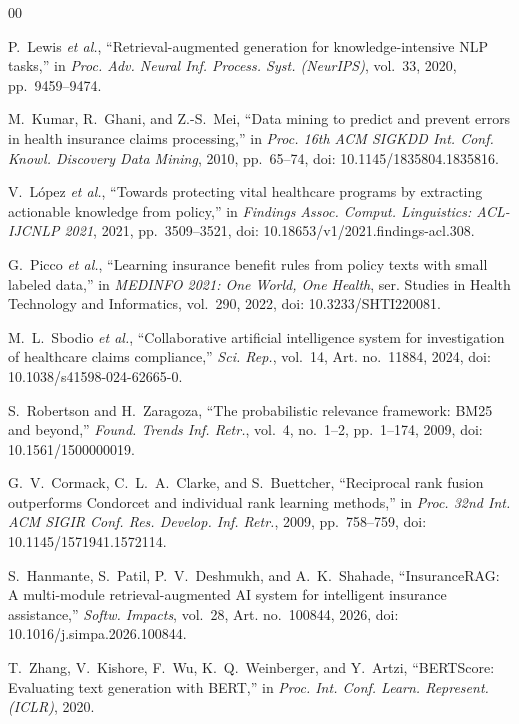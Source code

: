 \documentclass[conference]{IEEEtran}
\begin{document}
\begin{thebibliography}{00}

P.~Lewis \textit{et al.}, ``Retrieval-augmented generation for knowledge-intensive NLP tasks,'' in \emph{Proc. Adv. Neural Inf. Process. Syst. (NeurIPS)}, vol.~33, 2020, pp.~9459--9474.

M.~Kumar, R.~Ghani, and Z.-S.~Mei, ``Data mining to predict and prevent errors in health insurance claims processing,'' in \emph{Proc. 16th ACM SIGKDD Int. Conf. Knowl. Discovery Data Mining}, 2010, pp.~65--74, doi: 10.1145/1835804.1835816.

V.~L\'{o}pez \textit{et al.}, ``Towards protecting vital healthcare programs by extracting actionable knowledge from policy,'' in \emph{Findings Assoc. Comput. Linguistics: ACL-IJCNLP 2021}, 2021, pp.~3509--3521, doi: 10.18653/v1/2021.findings-acl.308.

G.~Picco \textit{et al.}, ``Learning insurance benefit rules from policy texts with small labeled data,'' in \emph{MEDINFO 2021: One World, One Health}, ser. Studies in Health Technology and Informatics, vol.~290, 2022, doi: 10.3233/SHTI220081.

M.~L.~Sbodio \textit{et al.}, ``Collaborative artificial intelligence system for investigation of healthcare claims compliance,'' \emph{Sci. Rep.}, vol.~14, Art. no.~11884, 2024, doi: 10.1038/s41598-024-62665-0.

S.~Robertson and H.~Zaragoza, ``The probabilistic relevance framework: BM25 and beyond,'' \emph{Found. Trends Inf. Retr.}, vol.~4, no.~1--2, pp.~1--174, 2009, doi: 10.1561/1500000019.

G.~V.~Cormack, C.~L.~A.~Clarke, and S.~Buettcher, ``Reciprocal rank fusion outperforms Condorcet and individual rank learning methods,'' in \emph{Proc. 32nd Int. ACM SIGIR Conf. Res. Develop. Inf. Retr.}, 2009, pp.~758--759, doi: 10.1145/1571941.1572114.

S.~Hanmante, S.~Patil, P.~V.~Deshmukh, and A.~K.~Shahade, ``InsuranceRAG: A multi-module retrieval-augmented AI system for intelligent insurance assistance,'' \emph{Softw. Impacts}, vol.~28, Art. no.~100844, 2026, doi: 10.1016/j.simpa.2026.100844.

T.~Zhang, V.~Kishore, F.~Wu, K.~Q.~Weinberger, and Y.~Artzi, ``BERTScore: Evaluating text generation with BERT,'' in \emph{Proc. Int. Conf. Learn. Represent. (ICLR)}, 2020.


\end{thebibliography}
\end{document}
